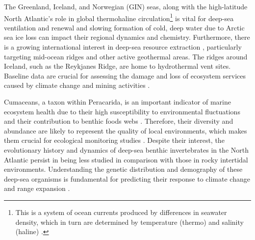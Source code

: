 The Greenland, Iceland, and Norwegian (GIN) seas, along with the high-latitude North Atlantic's role in global {thermohaline circulation}\footnote{This is a system of ocean currents produced by differences in seawater density, which in turn are determined by temperature (thermo) and salinity (haline) \citep{talley2013closure}.} is vital for deep-sea ventilation and renewal \citep{johannessen_relationship_1994, meisner_prefacebiodiversity_2018} and slowing formation of cold, deep water due to Arctic sea ice loss can impact their regional dynamics and chemistry. Furthermore, there is a growing international interest in deep-sea resource extraction \citep{mengerink_call_2014}, particularly targeting mid-ocean ridges and other active geothermal areas. The ridges around Iceland, such as the Reykjanes Ridge, are home to hydrothermal vent sites. Baseline data are crucial for assessing the damage and loss of ecosystem services caused by climate change and mining activities \citep{meisner_prefacebiodiversity_2018}. 

Cumaceans, a taxon within Peracarida, is an important indicator of marine ecosystem health due to their high susceptibility to environmental fluctuations \citep{stransky_diversity_2010} and their contribution to benthic foods webs \citep{rehm2009cumacea}. Therefore, their diversity and abundance are likely to represent the quality of local environments, which makes them crucial for ecological monitoring studies \citep{hessler1967faunal}. Despite their interest, the evolutionary history and dynamics of deep-sea benthic invertebrates in the North Atlantic persist in being less studied in comparison with those in rocky intertidal environments. Understanding the genetic distribution and demography of these deep-sea organisms is fundamental for predicting their response to climate change and range expansion \citep{jennings_phylogeographic_2014}.   

